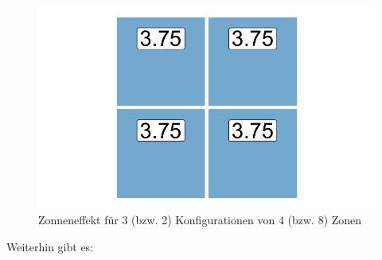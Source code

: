 \begin{figure}[htb]
\begin{minipage}[b]{.32\linewidth}
    \end{minipage}
    \hfill
    \begin{minipage}[b]{.32\linewidth}
       \includegraphics[width=\linewidth,trim={0.5cm 0.5cm 0.5cm 0.5cm},clip]{body/figures/46-zon_c.pdf}
    \end{minipage}
    \caption[Zoneneffekt]{Zonneneffekt für 3 (bzw. 2) Konfigurationen von 4 (bzw. 8) Zonen }
    \label{fig_zoning2}
 \end{figure}

Weiterhin gibt es:

